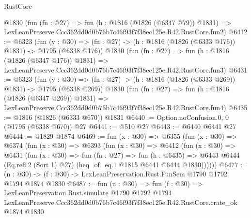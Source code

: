 \begin{lexlean}{RustCore}
\begin{coremodule}
    @1830
    (fun (fn : @27) =>
    fun (h : @1816 (@1826 (@6347 @79)) @1831) =>
    LexLeanPreserve.Ccc362dd0d0b76b7c46f93f7f38ec125e.R42.RustCore.fun2)
@6412 := @6323
    (fun (y : @30) => (fn : @27) -> (h : @1816 (@1826 (@6333 @176)) @1831) -> @1795 (@6338 @176))
    @1830
    (fun (fn : @27) =>
    fun (h : @1816 (@1826 (@6347 @176)) @1831) =>
    LexLeanPreserve.Ccc362dd0d0b76b7c46f93f7f38ec125e.R42.RustCore.fun3)
@6431 := @6323
    (fun (y : @30) => (fn : @27) -> (h : @1816 (@1826 (@6333 @269)) @1831) -> @1795 (@6338 @269))
    @1830
    (fun (fn : @27) =>
    fun (h : @1816 (@1826 (@6347 @269)) @1831) =>
    LexLeanPreserve.Ccc362dd0d0b76b7c46f93f7f38ec125e.R42.RustCore.fun4)
@6435 := @1816 (@1826 (@6333 @670)) @1831
@6440 := Option.noConfusion.{0, 0} (@1795 (@6338 @670)) @27
@6441 := @510 @27
@6443 := @6440 @6441 @27
@6444 := @1829 @1874
@6469 := fun (x : @30) =>
  @6355
    (fun (x : @30) =>
    @6374
      (fun (x : @30) =>
      @6393
        (fun (x : @30) =>
        @6412
          (fun (x : @30) =>
          @6431
            (fun (x : @30) =>
            fun (fn : @27) =>
            fun (h : @6435) =>
            @6443 @6444 (Eq.refl.{2} (Sort 1) @27) (heq_of_eq.{1} @1815 @6441 @6444 @1830))))))
@6477 := (n : @30) -> (f : @30) -> LexLeanPreservation.Rust.FunSem @1790 @1792 @1794 @1874 @1830
@6487 := fun (n : @30) =>
  fun (f : @30) =>
  LexLeanPreservation.Rust.simulate
    @1790
    @1792
    @1794
    LexLeanPreserve.Ccc362dd0d0b76b7c46f93f7f38ec125e.R42.RustCore.crate_ok
    @1874
    @1830
\end{coremodule}
\end{lexlean}
